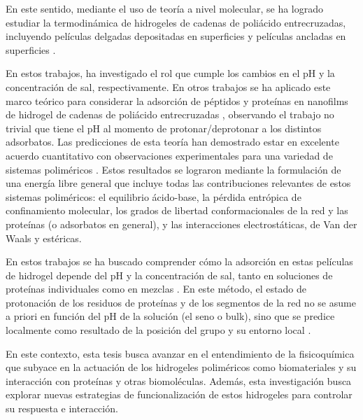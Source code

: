 En este sentido, mediante el uso de teor\'ia a nivel molecular, se ha logrado estudiar la termodin\'amica de hidrogeles de cadenas de poli\'acido entrecruzadas, incluyendo pel\'iculas delgadas depositadas en superficies \cite{longo2012molecular,nap2006weak} y pel\'iculas ancladas en superficies \cite{longo2014non}.

En estos trabajos, \citet{longo2014equilibrium} ha investigado el rol que cumple los cambios en el pH y la concentraci\'on de sal, respectivamente. En otros trabajos se ha aplicado este marco te\'orico para considerar la adsorci\'on de p\'eptidos y prote\'inas en nanofilms de hidrogel de cadenas de poli\'acido entrecruzadas \cite{longo2014equilibrium,narambuena2015lysozyme,longo2016adsorption,hagemann2018use,szleifer1997protein,fang2005kinetics}, observando el trabajo no trivial que tiene el pH al momento de protonar/deprotonar a los distintos adsorbatos.
Las predicciones de esta teor\'ia han demostrado estar en excelente acuerdo cuantitativo con observaciones experimentales para una variedad de sistemas polim\'ericos \cite{tagliazucchi2010responsive,wu2007behavior}.
Estos resultados se lograron mediante la formulaci\'on de una energ\'ia libre general que incluye todas las contribuciones relevantes de estos sistemas polim\'ericos: el equilibrio \'acido-base, la p\'erdida entr\'opica de confinamiento molecular, los grados de libertad conformacionales de la red y las prote\'inas (o adsorbatos en general), y las interacciones electrost\'aticas, de Van der Waals y est\'ericas.

En estos trabajos se ha buscado comprender c\'omo la adsorci\'on en estas pel\'iculas de hidrogel depende del pH y la concentraci\'on de sal, tanto en soluciones de prote\'inas individuales como en mezclas \cite{hagemann2018use,tagliazucchi2010responsive,longo2016adsorption}. En este m\'etodo, el estado de protonaci\'on de los residuos de prote\'inas y de los segmentos de la red no se asume a priori en funci\'on del pH de la soluci\'on (el seno o bulk), sino que se predice localmente como resultado de la posici\'on del grupo y su entorno local \cite{longo2019protonation,tagliazucchi2010responsive}.

En este contexto, esta tesis busca avanzar en el entendimiento de la fisicoqu\'imica que subyace en la actuaci\'on de los hidrogeles polim\'ericos como biomateriales y su interacci\'on con prote\'inas y otras biomol\'eculas. Adem\'as, esta investigaci\'on busca explorar nuevas estrategias de funcionalizaci\'on de estos hidrogeles para controlar su respuesta e interacci\'on.

